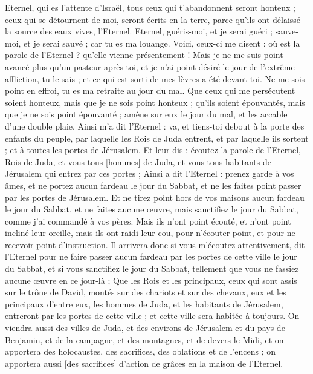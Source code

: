 \begin{multicols}{2}
Eternel, qui es l'attente d'Israël, tous ceux qui t'abandonnent seront honteux ; ceux qui se détournent de moi, seront écrits en la terre, parce qu'ils ont délaissé la source des eaux vives, l'Eternel.
Eternel, guéris-moi, et je serai guéri ; sauve-moi, et je serai sauvé ; car tu es ma louange.
Voici, ceux-ci me disent : où est la parole de l'Eternel ? qu'elle vienne présentement !
Mais je ne me suis point avancé plus qu'un pasteur après toi, et je n'ai point désiré le jour de l'extrême affliction, tu le sais ; et ce qui est sorti de mes lèvres a été devant toi.
Ne me sois point en effroi, tu es ma retraite au jour du mal.
Que ceux qui me persécutent soient honteux, mais que je ne sois point honteux ; qu'ils soient épouvantés, mais que je ne sois point épouvanté ; amène sur eux le jour du mal, et les accable d'une double plaie.
Ainsi m'a dit l'Eternel : va, et tiens-toi debout à la porte des enfants du peuple, par laquelle les Rois de Juda entrent, et par laquelle ils sortent ; et à toutes les portes de Jérusalem.
Et leur dis : écoutez la parole de l'Eternel, Rois de Juda, et vous tous [hommes] de Juda, et vous tous habitants de Jérusalem qui entrez par ces portes ;
Ainsi a dit l'Eternel : prenez garde à vos âmes, et ne portez aucun fardeau le jour du Sabbat, et ne les faites point passer par les portes de Jérusalem.
Et ne tirez point hors de vos maisons aucun fardeau le jour du Sabbat, et ne faites aucune œuvre, mais sanctifiez le jour du Sabbat, comme j'ai commandé à vos pères.
Mais ils n'ont point écouté, et n'ont point incliné leur oreille, mais ils ont raidi leur cou, pour n'écouter point, et pour ne recevoir point d'instruction.
Il arrivera donc si vous m'écoutez attentivement, dit l'Eternel pour ne faire passer aucun fardeau par les portes de cette ville le jour du Sabbat, et si vous sanctifiez le jour du Sabbat, tellement que vous ne fassiez aucune œuvre en ce jour-là ;
Que les Rois et les principaux, ceux qui sont assis sur le trône de David, montés sur des chariots et sur des chevaux, eux et les principaux d'entre eux, les hommes de Juda, et les habitants de Jérusalem, entreront par les portes de cette ville ; et cette ville sera habitée à toujours.
On viendra aussi des villes de Juda, et des environs de Jérusalem et du pays de Benjamin, et de la campagne, et des montagnes, et de devers le Midi, et on apportera des holocaustes, des sacrifices, des oblations et de l'encens ; on apportera aussi [des sacrifices] d'action de grâces en la maison de l'Eternel.

\end{multicols}
